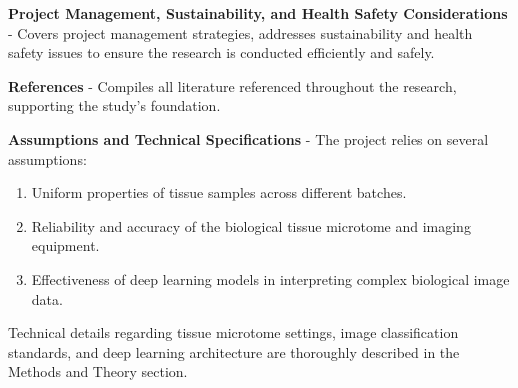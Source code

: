 \textbf{Project Management, Sustainability, and Health Safety Considerations} - Covers project management strategies, addresses sustainability and health safety issues to ensure the research is conducted efficiently and safely.

\textbf{References} - Compiles all literature referenced throughout the research, supporting the study's foundation.


\textbf{Assumptions and Technical Specifications} - The project relies on several assumptions:

\begin{enumerate}
    \item Uniform properties of tissue samples across different batches.
    \item Reliability and accuracy of the biological tissue microtome and imaging equipment.
    \item Effectiveness of deep learning models in interpreting complex biological image data.
\end{enumerate}

Technical details regarding tissue microtome settings, image classification standards, and deep learning architecture are thoroughly described in the Methods and Theory section.
